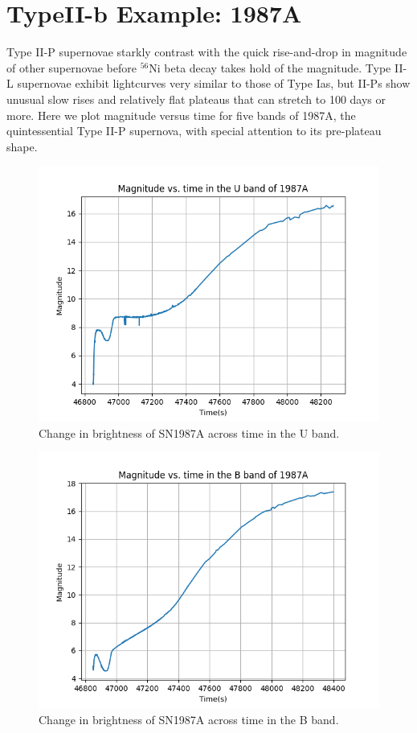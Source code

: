 \section{TypeII-b Example: 1987A}

Type II-P supernovae starkly contrast with the quick rise-and-drop in magnitude of other supernovae before $^{56}$Ni beta decay takes hold of the magnitude. Type II-L supernovae exhibit lightcurves very similar to those of Type Ias, but II-Ps show unusual slow rises and relatively flat plateaus that can stretch to 100 days or more. Here we plot magnitude versus time for five bands of 1987A, the quintessential Type II-P supernova, with special attention to its pre-plateau shape.

\begin{figure}[h]
	\includegraphics[width=1.0\textwidth]{1987A_U_magvstime.png}
	\caption{Change in brightness of SN1987A across time in the U band.}
\end{figure}
\begin{figure}[h]
	\includegraphics[width=1.0\textwidth]{1987A_B_magvstime.png}
	\caption{Change in brightness of SN1987A across time in the B band.}
\end{figure}
